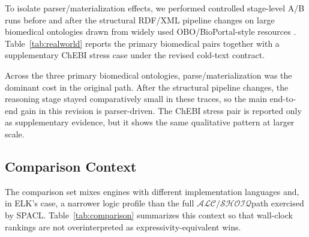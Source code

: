 \documentclass[preprint,12pt,times]{elsarticle}
\newcommand{\dlfrag}{\ensuremath{\mathcal{ALC/SHOIQ}}}
\begin{document}
To isolate parser/materialization effects, we performed controlled stage-level A/B runs before and after the structural RDF/XML pipeline changes on large biomedical ontologies drawn from widely used OBO/BioPortal-style resources \cite{bioportal}. Table~\ref{tab:realworld} reports the primary biomedical pairs together with a supplementary ChEBI stress case under the revised cold-text contract.

\begin{table}[htbp]
\centering
\caption{Stage-Level A/B on Real-World RDF/XML Ontologies (cold \texttt{.owl} runs; E2E = end-to-end wall clock; ChEBI is supplementary)}
\label{tab:realworld}
\end{table}

Across the three primary biomedical ontologies, parse/materialization was the dominant cost in the original path. After the structural pipeline changes, the reasoning stage stayed comparatively small in these traces, so the main end-to-end gain in this revision is parser-driven. The ChEBI stress pair is reported only as supplementary evidence, but it shows the same qualitative pattern at larger scale.

\subsection{Comparison Context}
\label{sec:comparison}

The comparison set mixes engines with different implementation languages and, in ELK's case, a narrower logic profile than the full \dlfrag path exercised by SPACL. Table~\ref{tab:comparison} summarizes this context so that wall-clock rankings are not overinterpreted as expressivity-equivalent wins.
\end{document}

